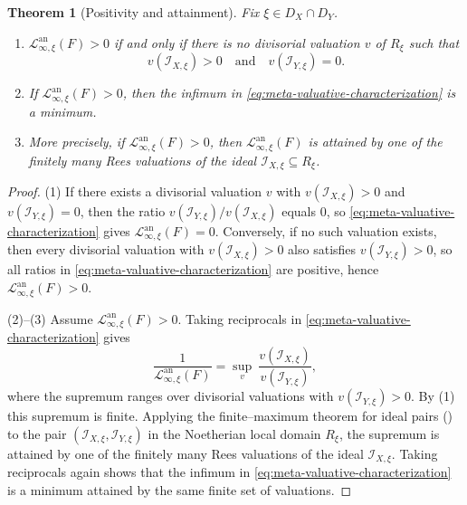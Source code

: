 \documentclass[12pt]{amsart}
\newcommand{\Loj}{\mathcal{L}} %
\theoremstyle{plain}
\newtheorem{theorem}{Theorem}[section]
\theoremstyle{definition}
\numberwithin{equation}{section}
\begin{document}
\begin{theorem}[Positivity and attainment]\label{thm:meta-infty-rees}
	Fix $\xi\in D_X\cap D_Y$.
	\begin{enumerate}
		\item
		$\Loj^{\text{an}}_{\infty,\xi}(F)>0$ if and only if there is no divisorial valuation $v$ of $R_\xi$
		such that
		\[
		v(\mathscr I_{X,\xi})>0
		\quad\text{and}\quad
		v(\mathscr I_{Y,\xi})=0.
		\]
		
		\item
		If $\Loj^{\text{an}}_{\infty,\xi}(F)>0$, then the infimum in
		\eqref{eq:meta-valuative-characterization} is a minimum.
		
		\item
		More precisely, if $\Loj^{\text{an}}_{\infty,\xi}(F)>0$, then $\Loj^{\text{an}}_{\infty,\xi}(F)$ is attained by
		one of the finitely many Rees valuations of the ideal
		$\mathscr I_{X,\xi} \subseteq R_\xi$.
	\end{enumerate}
\end{theorem}

\begin{proof} (1) If there exists a divisorial valuation $v$ with
	$v(\mathscr I_{X,\xi})>0$ and $v(\mathscr I_{Y,\xi})=0$, then the ratio
	$v(\mathscr I_{Y,\xi})/v(\mathscr I_{X,\xi})$ equals $0$, so
	\eqref{eq:meta-valuative-characterization} gives $\Loj^{\text{an}}_{\infty,\xi}(F)=0$.
	Conversely, if no such valuation exists, then every divisorial valuation with
	$v(\mathscr I_{X,\xi})>0$ also satisfies $v(\mathscr I_{Y,\xi})>0$, so all ratios in
	\eqref{eq:meta-valuative-characterization} are positive, hence
	$\Loj^{\text{an}}_{\infty,\xi}(F)>0$.
	
	\smallskip
	(2)--(3)
	Assume $\Loj^{\text{an}}_{\infty,\xi}(F)>0$.
	Taking reciprocals in \eqref{eq:meta-valuative-characterization} gives
	\[
	\frac{1}{\Loj^{\text{an}}_{\infty,\xi}(F)}
	=
	\sup_{v}\ \frac{v(\mathscr I_{X,\xi})}{v(\mathscr I_{Y,\xi})},
	\]
	where the supremum ranges over divisorial valuations with
	$v(\mathscr I_{Y,\xi})>0$.
	By (1) this supremum is finite.
	Applying the finite--maximum theorem for ideal pairs
	() to the pair
	$(\mathscr I_{X,\xi},\mathscr I_{Y,\xi})$ in the Noetherian local domain $R_\xi$,
	the supremum is attained by one of the finitely many Rees valuations of the ideal $\mathscr I_{X,\xi}$.
	Taking reciprocals again shows that the infimum in
	\eqref{eq:meta-valuative-characterization} is a minimum attained by the same
	finite set of valuations.
\end{proof}
\end{document}

